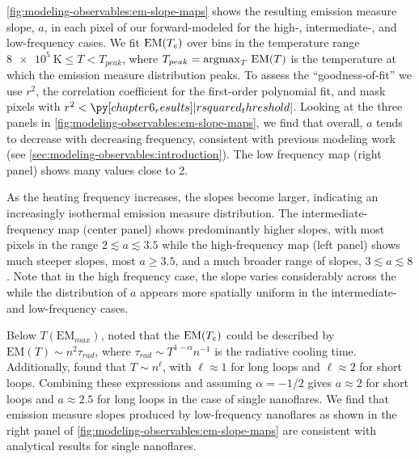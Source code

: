 \autoref{fig:modeling-observables:em-slope-maps} shows the resulting emission measure slope, $a$, in each pixel of our forward-modeled \AR{} for the high-, intermediate-, and low-frequency cases. We fit $\textup{EM}(T_e)$ over bins in the temperature range $\SI{8e5}{\kelvin}\le T< T_{peak}$, where $T_{peak}=\operatorname*{argmax}_T\,\mathrm{EM}(T)$ is the temperature at which the emission measure distribution peaks. To assess the ``goodness-of-fit'' we use $r^2$, the correlation coefficient for the first-order polynomial fit, and mask pixels with $r^2<\py[chapter6_results]|rsquared_threshold|$. Looking at the three panels in \autoref{fig:modeling-observables:em-slope-maps}, we find that overall, $a$ tends to decrease with decreasing frequency, consistent with previous modeling work (see \autoref{sec:modeling-observables:introduction}). The low frequency map (right panel) shows many values close to 2.

As the heating frequency increases, the slopes become larger, indicating an increasingly isothermal emission measure distribution. The intermediate-frequency map (center panel) shows predominantly higher slopes, with most pixels in the range $2\lesssim a \lesssim 3.5$ while the high-frequency map (left panel) shows much steeper slopes, most $a\ge3.5$, and a much broader range of slopes, $3\lesssim a \lesssim 8$. Note that in the high frequency case, the slope varies considerably across the \AR{} while the distribution of $a$ appears more spatially uniform in the intermediate- and low-frequency cases.

Below $T(\mathrm{EM}_{max})$, \citet{cargill_implications_1994} noted that the $\textup{EM}(T_e)$ could be described by $\mathrm{EM}(T)\sim n^2\tau_{rad}$, where $\tau_{rad}\sim T^{1-\alpha}n^{-1}$ is the radiative cooling time. Additionally, \citet{bradshaw_cooling_2010} found that $T\sim n^{\ell}$, with $\ell\approx1$ for long loops and $\ell\approx2$ for short loops. Combining these expressions and assuming $\alpha=-1/2$ \citep[i.e. using the radiative losses of][]{rosner_dynamics_1978} gives $a\approx2$ for short loops and $a\approx2.5$ for long loops in the case of single nanoflares. We find that emission measure slopes produced by low-frequency nanoflares as shown in the right panel of \autoref{fig:modeling-observables:em-slope-maps} are consistent with analytical results for single nanoflares.

